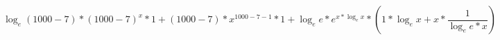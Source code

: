 \documentclass[a4paper]{article}
\begin{document}
$$
\log_{e}\left(1000-7\right)*\left(1000-7\right)^{x}*1+\left(1000-7\right)*x^{1000-7-1}*1+\log_{e}e*e^{x*\log_{e}x}*\left(1*\log_{e}x+x*\frac{1}{\log_{e}e*x}\right)
$$
\end{document}
